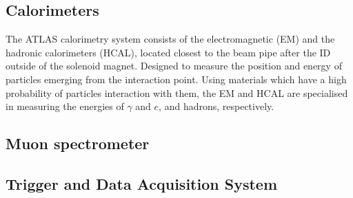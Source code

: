 \subsection{Calorimeters}\label{sec:method:Cals}
The ATLAS calorimetry system consists of the electromagnetic (EM) and the hadronic calorimeters (HCAL), located closest to the beam pipe after the ID outside of the solenoid magnet. Designed to measure the position and energy of particles emerging from the interaction point. Using materials which have a high probability of particles interaction with them, the EM and HCAL are specialised in measuring the energies of $\gamma$ and $e$, and hadrons, respectively.

\subsection{Muon spectrometer}\label{sec:method:MS}

\subsection{Trigger and Data Acquisition System}